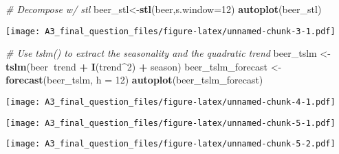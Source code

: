 \documentclass[]{article}
\newenvironment{Shaded}{\begin{snugshade}}{\end{snugshade}}
\newcommand{\CommentTok}[1]{\textcolor[rgb]{0.56,0.35,0.01}{\textit{#1}}}
\newcommand{\DataTypeTok}[1]{\textcolor[rgb]{0.13,0.29,0.53}{#1}}
\newcommand{\DecValTok}[1]{\textcolor[rgb]{0.00,0.00,0.81}{#1}}
\newcommand{\KeywordTok}[1]{\textcolor[rgb]{0.13,0.29,0.53}{\textbf{#1}}}
\newcommand{\NormalTok}[1]{#1}
\newcommand{\OperatorTok}[1]{\textcolor[rgb]{0.81,0.36,0.00}{\textbf{#1}}}
\newcommand{\StringTok}[1]{\textcolor[rgb]{0.31,0.60,0.02}{#1}}
\begin{document}
\begin{Shaded}
\begin{Highlighting}[]
\CommentTok{# Decompose w/ stl}
\NormalTok{beer_stl<-}\KeywordTok{stl}\NormalTok{(beer,}\DataTypeTok{s.window=}\DecValTok{12}\NormalTok{)}
\KeywordTok{autoplot}\NormalTok{(beer_stl)}
\end{Highlighting}
\end{Shaded}

\texttt{[image: A3\_final\_question\_files/figure-latex/unnamed-chunk-3-1.pdf]}

\begin{Shaded}
\begin{Highlighting}[]
\CommentTok{# Use tslm() to extract the seasonality and the quadratic trend}
\NormalTok{beer_tslm <-}\StringTok{ }\KeywordTok{tslm}\NormalTok{(beer}\OperatorTok{~}\NormalTok{trend }\OperatorTok{+}\StringTok{ }\KeywordTok{I}\NormalTok{(trend}\OperatorTok{^}\DecValTok{2}\NormalTok{) }\OperatorTok{+}\StringTok{ }\NormalTok{season)}
\NormalTok{beer_tslm_forecast <-}\StringTok{ }\KeywordTok{forecast}\NormalTok{(beer_tslm, }\DataTypeTok{h =} \DecValTok{12}\NormalTok{)}
\KeywordTok{autoplot}\NormalTok{(beer_tslm_forecast)}
\end{Highlighting}
\end{Shaded}

\texttt{[image: A3\_final\_question\_files/figure-latex/unnamed-chunk-4-1.pdf]}

\begin{Shaded}
\end{Shaded}

\texttt{[image: A3\_final\_question\_files/figure-latex/unnamed-chunk-5-1.pdf]}

\begin{Shaded}
\end{Shaded}

\texttt{[image: A3\_final\_question\_files/figure-latex/unnamed-chunk-5-2.pdf]}
\end{document}
